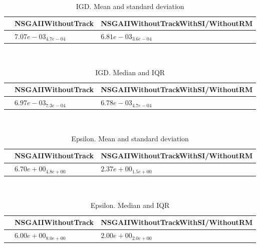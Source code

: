\documentclass{article}
\begin{document}
\
\begin{table}
\caption{IGD. Mean and standard deviation}
\label{table:mean.IGD}
\centering
\begin{scriptsize}
\begin{tabular}{lll}
\hline & NSGAIIWithoutTrack &  NSGAIIWithoutTrackWithSI/WithoutRM\\
\hline
 & \cellcolor{gray25}$  7.07e-03_{ 4.7e-04}$ & \cellcolor{gray95}$  6.81e-03_{ 3.6e-04}$ \\
\hline
\end{tabular}
\end{scriptsize}
\end{table}
\
\begin{table}
\caption{IGD. Median and IQR}
\label{table:median.IGD}
\begin{scriptsize}
\centering
\begin{tabular}{lll}
\hline & NSGAIIWithoutTrack &  NSGAIIWithoutTrackWithSI/WithoutRM\\
\hline
 & \cellcolor{gray25}$  6.97e-03_{ 7.3e-04}$ & \cellcolor{gray95}$  6.78e-03_{ 4.7e-04}$ \\
\hline
\end{tabular}
\end{scriptsize}
\end{table}
\
\begin{table}
\caption{Epsilon. Mean and standard deviation}
\label{table:mean.Epsilon}
\centering
\begin{scriptsize}
\begin{tabular}{lll}
\hline & NSGAIIWithoutTrack &  NSGAIIWithoutTrackWithSI/WithoutRM\\
\hline
 & \cellcolor{gray25}$  6.70e+00_{ 4.8e+00}$ & \cellcolor{gray95}$  2.37e+00_{ 1.5e+00}$ \\
\hline
\end{tabular}
\end{scriptsize}
\end{table}
\
\begin{table}
\caption{Epsilon. Median and IQR}
\label{table:median.Epsilon}
\begin{scriptsize}
\centering
\begin{tabular}{lll}
\hline & NSGAIIWithoutTrack &  NSGAIIWithoutTrackWithSI/WithoutRM\\
\hline
 & \cellcolor{gray25}$  6.00e+00_{ 8.0e+00}$ & \cellcolor{gray95}$  2.00e+00_{ 2.0e+00}$ \\
\hline
\end{tabular}
\end{scriptsize}
\end{table}
\end{document}

